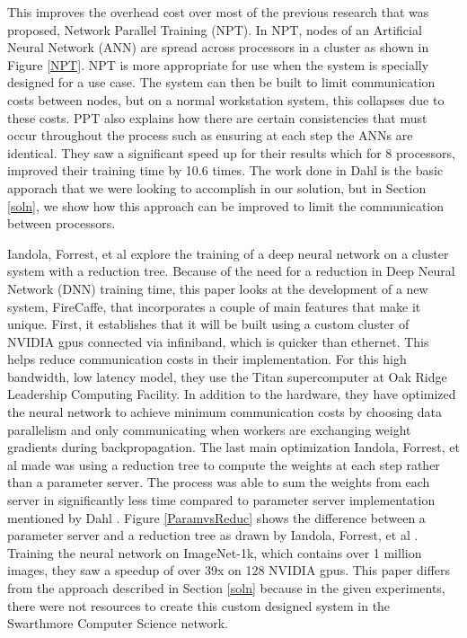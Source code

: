 \documentclass[11pt,twocolumn]{article}
\begin{document}
This improves the overhead cost over most of the previous research that was proposed, Network Parallel Training (NPT). In NPT, nodes of an Artificial Neural Network (ANN) are spread across processors in a cluster as shown in Figure \ref{NPT}. NPT is more appropriate for use when the system is specially designed for a use case. The system can then be built to limit communication costs between nodes, but on a normal workstation system, this collapses due to these costs. PPT also explains how there are certain consistencies that must occur throughout the process such as ensuring at each step the ANNs are identical. They saw a significant speed up for their results which for 8 processors, improved their training time by 10.6 times. The work done in Dahl is the basic apporach that we were looking to accomplish in our solution, but in Section \ref{soln}, we show how this approach can be improved to limit the communication between processors. 

Iandola, Forrest, et al \cite{iandola2016firecaffe} explore the training of a deep neural network on a cluster system with a reduction tree. Because of the need for a reduction in Deep Neural Network (DNN) training time, this paper looks at the development of a new system, FireCaffe, that incorporates a couple of main features that make it unique. First, it establishes that it will be built using a custom cluster of NVIDIA gpus connected via infiniband, which is quicker than ethernet. This helps reduce communication costs in their implementation. For this high bandwidth, low latency model, they use the Titan supercomputer at Oak Ridge Leadership Computing Facility. In addition to the hardware, they have optimized the neural network to achieve minimum communication costs by choosing data parallelism and only communicating when workers are exchanging weight gradients during backpropagation. The last main optimization Iandola, Forrest, et al made was using a reduction tree to compute the weights at each step rather than a parameter server. The process was able to sum the weights from each server in significantly less time compared to parameter server implementation mentioned by Dahl \cite{dahl:NNCluster}. Figure \ref{ParamvsReduc} shows the difference between a parameter server and a reduction tree as drawn by Iandola, Forrest, et al \cite{iandola2016firecaffe}. Training the neural network on ImageNet-1k, which contains over 1 million images, they saw a speedup of over 39x on 128 NVIDIA gpus. This paper differs from the approach described in Section \ref{soln} because in the given experiments, there were not resources to create this custom designed system in the Swarthmore Computer Science network. 
\end{document}
